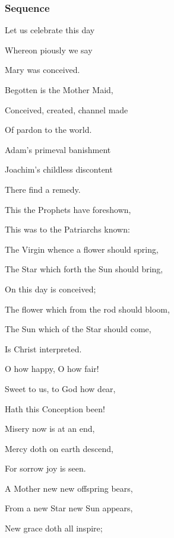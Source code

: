 \clearpage
\subsubsection{Sequence}
\begin{multicols}{2}
\begin{hangparas}{1.25em}{1}
Let us celebrate this day

Whereon piously we say

Mary was conceived.

Begotten is the Mother Maid,

Conceived, created, channel made

Of pardon to the world.

Adam's primeval banishment

Joachim's childless discontent

There find a remedy.

\vspace{2ex}

This the Prophets have foreshown,

This was to the Patriarchs known:

The Virgin whence a flower should spring,

The Star which forth the Sun should bring,

On this day is conceived;

The flower which from the rod should bloom,

The Sun which of the Star should come,

Is Christ interpreted.

\vspace{2ex}

O how happy, O how fair!

Sweet to us, to God how dear,

Hath this Conception been!

Misery now is at an end,

Mercy doth on earth descend,

For sorrow joy is seen.

A Mother new new offspring bears,

From a new Star new Sun appears,

New grace doth all inspire;


\end{hangparas}
\end{multicols}
